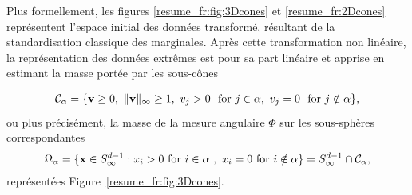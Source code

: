 Plus formellement, les figures \ref{resume_fr:fig:3Dcones} et \ref{resume_fr:2Dcones} représentent l'espace initial des données transformé, résultant de la standardisation classique des marginales. Après cette transformation non linéaire, la représentation des données extrêmes est pour sa part linéaire et apprise en estimant la masse portée par les sous-cônes

\begin{align*}
 \mathcal{C}_\alpha = \{\mathbf v \ge 0,~\|\mathbf v\|_\infty \ge 1,~ v_j > 0 ~\text{ for } j \in \alpha,~ v_j = 0 ~\text{ for } j \notin \alpha \},
\end{align*}
ou plus précisément, la masse de la mesure angulaire $\Phi$ sur les sous-sphères correspondantes
\begin{align*}
\Omega_{\alpha}  = \{\mathbf x \in S_{\infty}^{d-1} :  x_i > 0 \text{ for } i\in\alpha~,~  x_i = 0 \text{ for } i\notin \alpha   \} 
 = S_{\infty}^{d-1}\cap {\mathcal{C}}_\alpha,
\end{align*}
représentées Figure~\ref{resume_fr:fig:3Dcones}.

